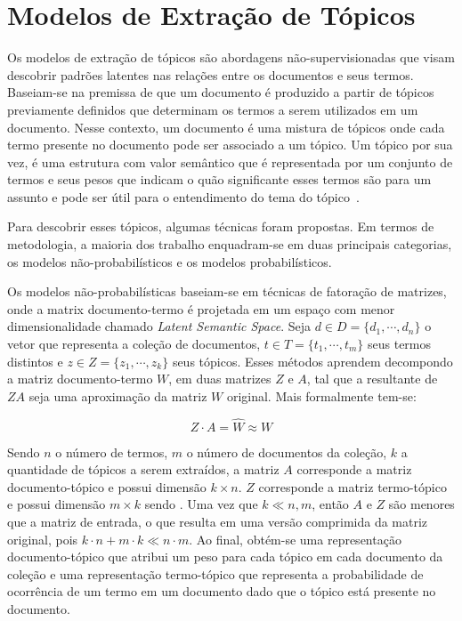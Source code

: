 
\section{Modelos de Extração de Tópicos}

Os modelos de extração de tópicos são abordagens não-supervisionadas que visam descobrir padrões latentes nas relações entre os documentos e seus termos.  Baseiam-se na premissa de que um documento é produzido a partir de tópicos previamente definidos que determinam os termos a serem utilizados em um documento. Nesse contexto, um documento é uma mistura de tópicos onde cada termo presente no documento pode ser associado a um tópico. Um tópico por sua vez, é uma estrutura com valor semântico que é representada por um conjunto de termos e seus pesos que indicam o quão significante esses termos são para um assunto e pode ser útil para o  entendimento do tema do tópico~\cite{Steyvers2007,Blei2012}.

Para descobrir esses tópicos, algumas técnicas foram propostas. Em termos de metodologia, a maioria dos trabalho enquadram-se em duas principais categorias, os modelos não-probabilísticos e os modelos probabilísticos.



Os modelos não-probabilísticas baseiam-se em técnicas de fatoração de matrizes, onde a matrix documento-termo é projetada em um espaço com menor dimensionalidade chamado \textit{Latent Semantic Space}. 
Seja
$d \in D = \{d_1,\cdots,d_n\}$ o vetor que representa a coleção de documentos, 
$t \in T = \{t_1,\cdots,t_m\}$ seus termos distintos e 
$z \in Z = \{z_1,\cdots,z_k\}$ seus tópicos. 
Esses métodos aprendem decompondo a matriz documento-termo $W$, em duas matrizes $Z$ e $A$, tal que a resultante de $ZA$ seja uma aproximação da matriz $W$ original. Mais formalmente tem-se:

\begin{equation}
	Z\cdot A = \hat{W} \approx W
\end{equation}

Sendo $n$ o número de termos, $m$ o número de documentos da coleção, $k$ a quantidade de tópicos a serem extraídos, a matriz $A$ corresponde a matriz documento-tópico e possui dimensão $k \times n$. $Z$ corresponde a matriz termo-tópico e possui dimensão $m \times k$ sendo . Uma vez que $k \ll n,m$, então $A$ e $Z$ são menores que a matriz de entrada, o que resulta em uma versão comprimida da matriz original, pois $k \cdot n + m \cdot k \ll n \cdot m$. Ao final, obtém-se uma representação documento-tópico que atribui um peso para cada tópico em cada documento da coleção e uma representação termo-tópico que representa a probabilidade de ocorrência de um termo em um documento dado que o tópico está presente no documento.

